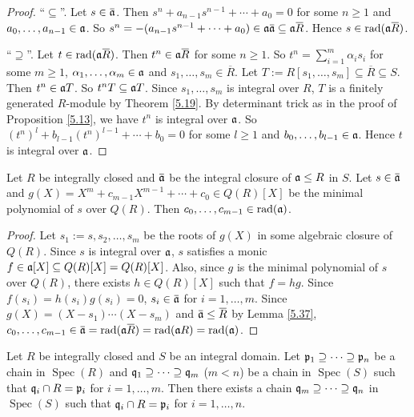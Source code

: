 \begin{proof}
    ``$\subseteq$''. Let $s \in \overbar{\ffa}$. Then $s^{n} + a_{n-1}s^{n-1} + \cdots + a_0 = 0$ for some $n \geq 1$ and $a_0,\ldots,a_{n-1} \in \mathfrak{a}$. So $s^{n} = -(a_{n-1}s^{n-1} + \cdots + a_0) \in \ffa \overbar{\ffa} \subseteq \ffa \overbar{R}$. Hence $s \in \operatorname{rad}(\ffa \overbar{R})$. \par 
    ``$\supseteq$''. Let $t \in \operatorname{rad}(\ffa \overbar{R})$. Then $t^{n} \in \ffa \overbar{R}$ for some $n \geq 1$. So $t^{n} = \sum_{i=1}^{m} \alpha_is_i$ for some $m \geq 1$, $\alpha_1,\ldots,\alpha_m \in \mathfrak{a}$ and $s_1,\ldots,s_m \in \overbar{R}$. Let $T := R[s_1,\ldots,s_m] \subseteq \overbar{R} \subseteq S$. Then $t^{n} \in \mathfrak{a} T$. So $t^{n}T \subseteq \mathfrak{a} T$. Since $s_1,\ldots,s_m$ is integral over $R$, $T$ is a finitely generated $R$-module by Theorem \ref{5.19}. By determinant trick as in the proof of Proposition \ref{5.13}, we have $t^{n}$ is integral over $\mathfrak{a}$. So $(t^{n})^{l} + b_{l-1}(t^{n})^{l-1} + \cdots + b_0 = 0$ for some $l \geq 1$ and $b_0,\ldots,b_{l-1} \in \mathfrak{a}$. Hence $t$ is integral over $\mathfrak{a}$.
\end{proof}

\begin{proposition}\label{5.38}
    Let $R$ be integrally closed and $\overbar{\ffa}$ be the integral closure of $\mathfrak{a} \leq R$ in $S$. Let $s \in \overbar{\ffa}$ and $g(X) = X^{m} + c_{m-1}X^{m-1} + \cdots + c_0 \in Q(R)[X]$ be the minimal polynomial of $s$ over $Q(R)$. Then $c_0,\ldots,c_{m-1} \in \operatorname{rad}(\mathfrak{a})$.
\end{proposition}

\begin{proof}
    Let $s_1:=s,s_2,\ldots,s_m$ be the roots of $g(X)$ in some algebraic closure of $Q(R)$. Since $s$ is integral over $\mathfrak{a}$, $s$ satisfies a monic $f \in \mathfrak{a}[X] \subseteq Q(R)[X] = Q(R)[X]$. Also, since $g$ is the minimal polynomial of $s$ over $Q(R)$, there exists $h \in Q(R)[X]$ such that $f = hg$. Since $f(s_i) = h(s_i)g(s_i) = 0$, $s_i \in \overbar{\ffa}$ for $i = 1,\ldots,m$. Since $g(X) = (X-s_1) \cdots (X-s_m)$ and $\overbar{\ffa} \leq \overbar{R}$ by Lemma \ref{5.37}, $c_0,\ldots,c_{m-1} \in \overbar{\ffa} = \operatorname{rad}(\ffa \overbar{R}) = \operatorname{rad}(\ffa R) = \operatorname{rad}(\ffa)$. 
\end{proof}

\begin{theorem}\label{5.39}
    Let $R$ be integrally closed and $S$ be an integral domain. Let $\mathfrak{p}_1 \supseteq \cdots \supseteq \mathfrak{p}_n$ be a chain in $\operatorname{Spec}(R)$ and $\mathfrak{q}_1 \supseteq \cdots \supseteq \mathfrak{q}_m$ ($m < n$) be a chain in $\operatorname{Spec}(S)$ such that $\mathfrak{q}_i \cap R = \mathfrak{p}_i$ for $i = 1,\ldots,m$. Then there exists a chain $\mathfrak{q}_m \supseteq \cdots \supseteq \mathfrak{q}_n$ in $\operatorname{Spec}(S)$ such that $\mathfrak{q}_i \cap R = \mathfrak{p}_i$ for $i = 1,\ldots,n$. 
\end{theorem}

